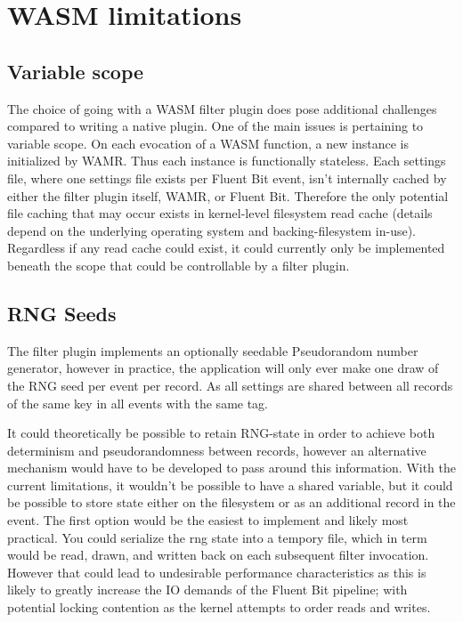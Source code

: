 \section{WASM limitations}
\subsection{Variable scope}
The choice of going with a WASM filter plugin does pose additional challenges compared to writing a native plugin. One of the main issues is pertaining to variable scope. On each evocation of a WASM function, a new instance is initialized by WAMR. Thus each instance is functionally stateless. Each settings file, where one settings file exists per Fluent Bit event, isn't internally cached by either the filter plugin itself, WAMR, or Fluent Bit. Therefore the only potential file caching that may occur exists in kernel-level filesystem read cache (details depend on the underlying operating system and backing-filesystem in-use). Regardless if any read cache could exist, it could currently only be implemented beneath the scope that could be controllable by a filter plugin.

\subsection{RNG Seeds}
The filter plugin implements an optionally seedable Pseudorandom number generator, however in practice, the application will only ever make one draw of the RNG seed per event per record. As all settings are shared between all records of the same key in all events with the same tag.

It could theoretically be possible to retain RNG-state in order to achieve both determinism and pseudorandomness between records, however an alternative mechanism would have to be developed to pass around this information. With the current limitations, it wouldn't be possible to have a shared variable, but it could be possible to store state either on the filesystem or as an additional record in the event. The first option would be the easiest to implement and likely most practical. You could serialize the rng state into a tempory file, which in term would be read, drawn, and written back on each subsequent filter invocation. However that could lead to undesirable performance characteristics as this is likely to greatly increase the IO demands of the Fluent Bit pipeline; with potential locking contention as the kernel attempts to order reads and writes.


